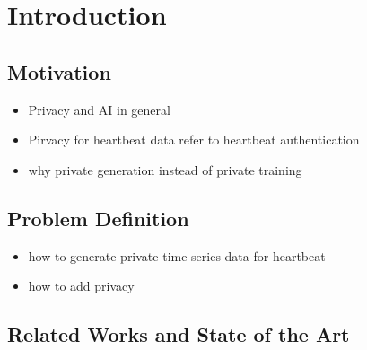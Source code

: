 \section{Introduction}

\subsection{Motivation}
\begin{itemize}
    \item Privacy and AI in general
    \item Pirvacy for heartbeat data refer to heartbeat authentication
    \item why private generation instead of private training
\end{itemize}
\subsection{Problem Definition}
    \begin{itemize}
        \item how to generate private time series data for heartbeat
        \item how to add privacy
    \end{itemize}
\subsection{Related Works and State of the Art}